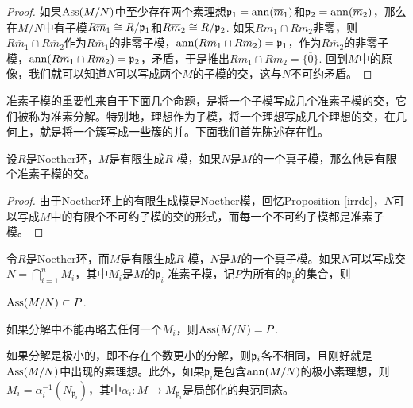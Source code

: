 \begin{proof}
	如果$\operatorname{Ass}(M/N)$中至少存在两个素理想$\mathfrak{p}_1=\operatorname{ann}(\overline{m}_1)$和$\mathfrak{p}_2=\operatorname{ann}(\overline{m}_2)$，那么在$M/N$中有子模$R\overline{m}_1\cong R/\mathfrak{p}_1$和$R\overline{m}_2\cong R/\mathfrak{p}_2$. 如果$R\overline{m}_1\cap R\overline{m}_2$非零，则$R\overline{m}_1\cap R\overline{m}_2$作为$R\overline{m}_1$的非零子模，$\operatorname{ann}(R\overline{m}_1\cap R\overline{m}_2)=\mathfrak{p}_1$，作为$R\overline{m}_2$的非零子模，$\operatorname{ann}(R\overline{m}_1\cap R\overline{m}_2)=\mathfrak{p}_2$，矛盾，于是推出$R\overline{m}_1\cap R\overline{m}_2=\{\overline{0}\}$. 回到$M$中的原像，我们就可以知道$N$可以写成两个$M$的子模的交，这与$N$不可约矛盾。
\end{proof}

准素子模的重要性来自于下面几个命题，是将一个子模写成几个准素子模的交，它们被称为准素分解。特别地，理想作为子模，将一个理想写成几个理想的交，在几何上，就是将一个簇写成一些簇的并。下面我们首先陈述存在性。

\begin{pro}
设$R$是Noether环，$M$是有限生成$R$-模，如果$N$是$M$的一个真子模，那么他是有限个准素子模的交。
\end{pro}

\begin{proof}
由于Noether环上的有限生成模是Noether模，回忆Proposition \ref{irrde}，$N$可以写成$M$中的有限个不可约子模的交的形式，而每一个不可约子模都是准素子模。
\end{proof}

\begin{thm}\label{thm:5.2.17}
	令$R$是Noether环，而$M$是有限生成$R$-模，$N$是$M$的一个真子模。如果$N$可以写成交$N=\bigcap_{i=1}^n M_i$，其中$M_i$是$M$的$\mathfrak p_i$-准素子模，记$P$为所有的$\mathfrak p_i$的集合，则
	\begin{compactenum}
		\item $\operatorname{Ass}(M/N)\subset P$.
		\item 如果分解中不能再略去任何一个$M_i$，则$\operatorname{Ass}(M/N) = P$.
		\item 如果分解是极小的，即不存在个数更小的分解，则$\mathfrak{p}_i$各不相同，且刚好就是$\operatorname{Ass}(M/N)$中出现的素理想。此外，如果$\mathfrak p_i$是包含$\operatorname{ann}(M/N)$的极小素理想，则$M_i=\alpha_i^{-1}(N_{\mathfrak p_i})$，其中$\alpha_i:M\to M_{\mathfrak p_i}$是局部化的典范同态。
	\end{compactenum}
\end{thm}

